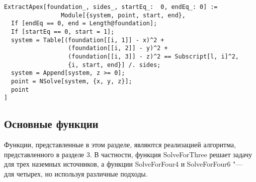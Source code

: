 \documentclass[../main.tex]{subfiles}
\begin{document}
\begin{lstlisting}
ExtractApex[foundation_, sides_, startEq_:  0, endEq_: 0] :=
                Module[{system, point, start, end},
  If [endEq == 0, end = Length@foundation];
  If [startEq == 0, start = 1];
  system = Table[(foundation[[i, 1]] - x)^2 +
                  (foundation[[i, 2]] - y)^2 +
                  (foundation[[i, 3]] - z)^2 == Subscript[l, i]^2,
                  {i, start, end}] /. sides;
  system = Append[system, z >= 0];
  point = NSolve[system, {x, y, z}];
  point
]
\end{lstlisting}

\subsection{Основные функции}
Функции, представленные в этом разделе, являются реализацией алгоритма, представленного в разделе 3. В частности, функция {\ttfamily SolveForThree} решает задачу для трех наземных источников, а функции {\ttfamily SolveForFour4} и {\ttfamily SolveForFour6} "--- для четырех, но используя различные подходы.
\end{document}
